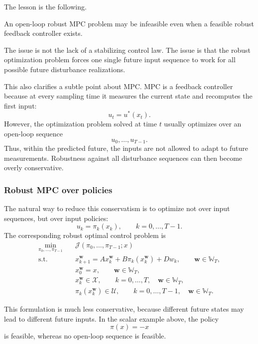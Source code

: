 The lesson is the following.

\begin{theorembox}
An open-loop robust MPC problem may be infeasible even when a feasible robust feedback
controller exists.

The issue is not the lack of a stabilizing control law. The issue is that the robust optimization
problem forces one single future input sequence to work for all possible future disturbance
realizations.
\end{theorembox}

This also clarifies a subtle point about MPC. MPC is a feedback controller because at every
sampling time it measures the current state and recomputes the first input:
\[
u_t=u^*(x_t).
\]
However, the optimization problem solved at time $t$ usually optimizes over an open-loop
sequence
\[
u_0,\dots,u_{T-1}.
\]
Thus, within the predicted future, the inputs are not allowed to adapt to future measurements.
Robustness against all disturbance sequences can then become overly conservative.

\subsubsection{Robust MPC over policies}

The natural way to reduce this conservatism is to optimize not over input sequences, but over
input policies:
\[
u_k=\pi_k(x_k), \qquad k=0,\dots,T-1.
\]
The corresponding robust optimal control problem is
\begin{align*}
\min_{\pi_0,\dots,\pi_{T-1}} \quad
& \mathcal J(\pi_0,\dots,\pi_{T-1};x)\\
\text{s.t.}\quad
& x_{k+1}^{\mathbf w}
= A x_k^{\mathbf w}
+ B \pi_k\left(x_k^{\mathbf w}\right)
+ D w_k,
\qquad \mathbf w\in\mathbb W_T,\\
& x_0^{\mathbf w}=x,
\qquad \mathbf w\in\mathbb W_T,\\
& x_k^{\mathbf w}\in\mathcal X,
\qquad k=0,\dots,T,\quad \mathbf w\in\mathbb W_T,\\
& \pi_k\left(x_k^{\mathbf w}\right)\in\mathcal U,
\qquad k=0,\dots,T-1,\quad \mathbf w\in\mathbb W_T.
\end{align*}

This formulation is much less conservative, because different future states may lead to
different future inputs. In the scalar example above, the policy
\[
\pi(x)=-x
\]
is feasible, whereas no open-loop sequence is feasible.

